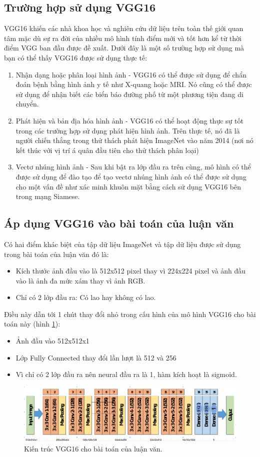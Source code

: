 \subsection{Trường hợp sử dụng VGG16}
VGG16 khiến các nhà khoa học và nghiên cứu dữ liệu trên toàn thế giới quan tâm mặc dù sự ra đời của nhiều mô hình tính điểm mới và tốt hơn kể từ thời điểm VGG ban đầu được đề xuất. Dưới đây là một số trường hợp sử dụng mà bạn có thể thấy VGG16 được sử dụng thực tế:
\begin{enumerate}
	\item Nhận dạng hoặc phân loại hình ảnh - VGG16 có thể được sử dụng để chẩn đoán bệnh bằng hình ảnh y tế như X-quang hoặc MRI. Nó cũng có thể được sử dụng để nhận biết các biển báo đường phố từ một phương tiện đang di chuyển.
	\item Phát hiện và bản địa hóa hình ảnh - VGG16 có thể hoạt động thực sự tốt trong các trường hợp sử dụng phát hiện hình ảnh. Trên thực tế, nó đã là người chiến thắng trong thử thách phát hiện ImageNet vào năm 2014 (nơi nó kết thúc với vị trí á quân đầu tiên cho thử thách phân loại)
	\item Vectơ nhúng hình ảnh - Sau khi bật ra lớp đầu ra trên cùng, mô hình có thể được sử dụng để đào tạo để tạo vectơ nhúng hình ảnh có thể được sử dụng cho một vấn đề như xác minh khuôn mặt bằng cách sử dụng VGG16 bên trong mạng Siamese.
\end{enumerate}

\subsection{Áp dụng VGG16 vào bài toán của luận văn}
Có hai điểm khác biệt của tập dữ liệu ImageNet và tập dữ liệu được sử dụng trong bài toán của luận văn \cite{dataset} đó là:
\begin{itemize}
	\item Kích thước ảnh đầu vào là 512x512 pixel thay vì 224x224 pixel và ảnh đầu vào là ảnh đa mức xám thay vì ảnh RGB.
	\item Chỉ có 2 lớp đầu ra: Có lao hay không có lao.
\end{itemize}

Điều này dẫn tới 1 chút thay đổi nhỏ trong cấu hình của mô hình VGG16 cho bài toán này (hình \ref{fig:vgg16_luanvan}):
\begin{itemize}
	\item Ảnh đầu vào 512x512x1
	\item Lớp Fully Connected thay đổi lần lượt là 512 và 256
	\item Vì chỉ có 2 lớp đầu ra nên neural đầu ra là 1, hàm kích hoạt là sigmoid. 
\end{itemize}
\begin{figure}[H]
	\centering
	\includegraphics[width=1\linewidth]{images/vgg16_luanvan}
	\caption{Kiến trúc VGG16 cho bài toán của luận văn.}
	\label{fig:vgg16_luanvan}
\end{figure}